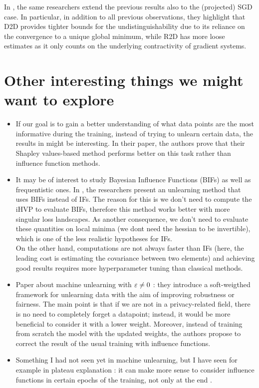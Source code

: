 In \cite{mu_SGD_2025}, the same researchers extend the previous results also to the (projected) SGD case.
In particular, in addition to all previous observations, they highlight that D2D provides tighter bounds for the undistinguishability due to its reliance on the convergence to a unique global minimum, while R2D has more loose estimates as it only counts on the underlying contractivity of gradient systems.

\section*{Other interesting things we might want to explore}
\begin{itemize}
  \item If our goal is to gain a better understanding of what data points are the most informative during the training, instead of trying to unlearn certain data, the results in \cite{ghorbani_data_2019} might be interesting.
  In their paper, the authors prove that their Shapley values-based method performs better on this task rather than influence function methods. 
  \item It may be of interest to study Bayesian Influence Functions (BIFs) as well as frequentistic ones. 
  In \cite{kreer_bayesian_2025}, the researchers present an unlearning method that uses BIFs instead of IFs. The reason for this is we don't need to compute the iHVP to evaluate BIFs, therefore this method works better with more singular loss landscapes.
  As another consequence, we don't need to evaluate these quantities on local minima (we dont need the hessian to be invertible), which is one of the less realistic hypotheses for IFs.\\
  On the other hand, computations are not always faster than IFs (here, the leading cost is estimating the covariance between two elements) and achieving good results requires more hyperparameter tuning than classical methods.
  \item Paper about machine unlearning with $\varepsilon\neq0$ \cite{qiao_soft_2025}: they introduce a soft-weigthed framework for unlearning data with the aim of improving robustness or fairness.
  The main point is that if we are not in a privacy-related field, there is no need to completely forget a datapoint; instead, it would be more beneficial to consider it with a lower weight.
  Moreover, instead of training from scratch the model with the updated weights, the authors propose to correct the result of the usual training with influence functions.
  \item Something I had not seen yet in machine unlearning, but I have seen for example in plateau explanation \cite{Berthier_2024}: it can make more sense to consider influence functions in certain epochs of the training, not only at the end \cite{lee_timescales_2025}. 

\end{itemize}
